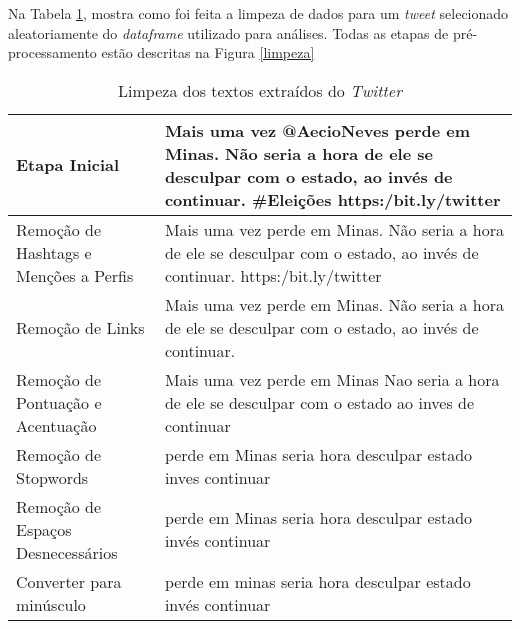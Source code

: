     Na Tabela \ref{tb:limpeza}, mostra como foi feita a limpeza de dados para um 
\textit{tweet} selecionado aleatoriamente do \textit{dataframe} utilizado para análises. Todas as etapas de pré-processamento
estão descritas na Figura \ref{limpeza}


\begin{table}
    \centering
    \caption{Limpeza dos textos extraídos do \textit{Twitter}}
    \label{tb:limpeza}
    
    \begin{tabular}{l|p{8cm}} 
    \hline
    Etapa Inicial       & Mais uma vez @AecioNeves perde em Minas.   Não seria a hora de ele se desculpar com o estado,   ao invés de continuar.  \#Eleições https:/bit.ly/twitter \\ \hline
    Remoção de Hashtags  e Menções a Perfis  & Mais uma vez    perde em Minas. Não seria a hora de ele se desculpar com o estado, ao invés de continuar. https:/bit.ly/twitter \\ \hline
    Remoção de Links                                                                  & Mais uma      vez perde em Minas. Não seria a hora de ele se desculpar com o estado, ao invés de continuar.   \\ \hline                                                                                                                                                    
    Remoção de Pontuação e  Acentuação                                               & Mais uma      vez perde em Minas Nao seria a hora de ele se desculpar com o estado ao inves de continuar  \\ \hline                                                                                                                                             
    Remoção de Stopwords                                                              & perde em Minas  seria  hora  desculpar  estado  inves continuar \\ \hline                                                                                                                                                                                         
    Remoção de Espaços Desnecessários                                             & perde em Minas seria hora desculpar estado invés continuar   \\ \hline                                                                                                                                                                                            
    Converter para minúsculo                                                          & perde em minas seria hora desculpar estado invés continuar  \\ \hline                                                                                                                                                                                                   
    \end{tabular}
    \end{table}



